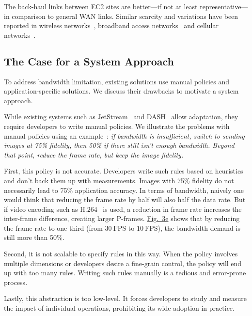 The back-haul links between EC2 sites are better---if not at least
representative---in comparison to general WAN links. Similar scarcity and
variations have been reported in wireless networks~\cite{biswas2015large},
broadband access networks~\cite{grover2013peeking, sundaresan2014bismark} and
cellular networks~\cite{nikravesh2014mobile}.

\subsection{The Case for a System Approach}
\label{sec:making-case-sys-approach}

To address bandwidth limitation, existing solutions use manual policies and
application-specific solutions. We discuss their drawbacks to motivate a system
approach.

 While existing systems such as
JetStream~\cite{rabkin2014aggregation} and DASH~\cite{sodagar2011mpeg} allow
adaptation, they require developers to write manual policies. We illustrate the
problems with manual policies using an example~\cite{rabkin2014aggregation}:
\textit{if bandwidth is insufficient, switch to sending images at 75\% fidelity,
  then 50\% if there still isn't enough bandwidth. Beyond that point, reduce the
  frame rate, but keep the image fidelity.}

First, this policy is not accurate.  Developers write such rules based on
heuristics and don't back them up with measurements. Images with 75\% fidelity
do not necessarily lead to 75\% application accuracy. In terms of bandwidth,
naively one would think that reducing the frame rate by half will also half the
data rate. But if video encoding such as H.264~\cite{richardson2011h} is used, a
reduction in frame rate increases the inter-frame difference, creating larger
P-frames. \hyperref[fig:app-specific]{Fig.~3e} shows that by reducing the frame
rate to one-third (from \(30~\text{FPS}\) to \(10~\text{FPS}\)), the bandwidth
demand is still more than 50\%.

Second, it is not scalable to specify rules in this way. When the policy
involves multiple dimensions or developers desire a fine-grain control, the
policy will end up with too many rules.  Writing such rules manually is a
tedious and error-prone process.

Lastly, this abstraction is too low-level. It forces developers to study and
measure the impact of individual operations, prohibiting its wide adoption in
practice.

